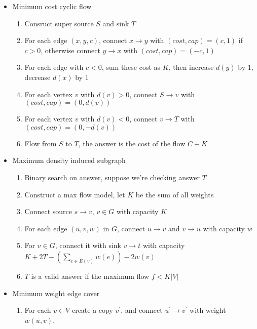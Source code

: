 \begin{itemize}
\begin{enumerate}
    \end{enumerate}
    \item Minimum cost cyclic flow
    \begin{enumerate}
        \item Consruct super source $S$ and sink $T$
        \item For each edge $(x, y, c)$, connect $x \rightarrow y$ with $(cost, cap) = (c, 1)$ if $c > 0$, otherwise connect $y \rightarrow x$ with $(cost, cap) = (-c, 1)$
        \item For each edge with $c < 0$, sum these cost as $K$, then increase $d(y)$ by 1, decrease $d(x)$ by 1
        \item For each vertex $v$ with $d(v) > 0$, connect $S \rightarrow v$ with $(cost, cap) = (0, d(v))$
        \item For each vertex $v$ with $d(v) < 0$, connect $v \rightarrow T$ with $(cost, cap) = (0, -d(v))$
        \item Flow from $S$ to $T$, the answer is the cost of the flow $C + K$
    \end{enumerate}
    \item Maximum density induced subgraph
    \begin{enumerate}
        \item Binary search on answer, suppose we're checking answer $T$
        \item Construct a max flow model, let $K$ be the sum of all weights
        \item Connect source $s \rightarrow v$, $v \in G$ with capacity $K$
        \item For each edge $(u, v, w)$ in $G$, connect $u \rightarrow v$ and $v \rightarrow u$ with capacity $w$
        \item For $v \in G$, connect it with sink $v \rightarrow t$ with capacity $K + 2T - (\sum_{e \in E(v)}{w(e)}) - 2w(v)$
        \item $T$ is a valid answer if the maximum flow $f < K \lvert V \rvert$
    \end{enumerate}
    \item Minimum weight edge cover
    \begin{enumerate}
      \item For each $v \in V$ create a copy $v^\prime$, and connect $u^\prime \to v^\prime$ with weight $w(u, v)$.

\end{enumerate}
\end{itemize}
